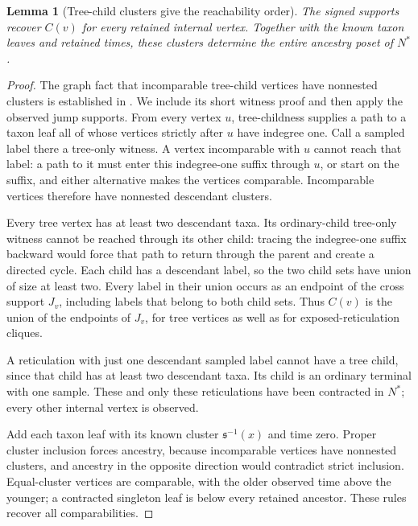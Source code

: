 \documentclass[11pt]{article}
\newtheorem{lemma}[theorem]{Lemma}
\begin{document}
\begin{lemma}[Tree-child clusters give the reachability order]
\label{lem:cluster-poset}
The signed supports recover $C(v)$ for every retained internal vertex.
Together with the known taxon leaves and retained times, these clusters
determine the entire ancestry poset of $N^*$.
\end{lemma}
\begin{proof}
The graph fact that incomparable tree-child vertices have nonnested clusters
is established in \citet[Lemma~33 and Corollary~13]{HellmuthSchallerStadler2023}.
We include its short witness proof and then apply the observed jump supports.
From every vertex $u$, tree-childness supplies a path to a taxon leaf all of
whose vertices strictly after $u$ have indegree one.  Call a sampled label
there a tree-only witness.  A vertex incomparable with $u$ cannot reach that
label: a path to it must enter this indegree-one suffix through $u$, or start
on the suffix, and either alternative makes the vertices comparable.
Incomparable vertices therefore have nonnested descendant clusters.

Every tree vertex has at least two descendant taxa.  Its ordinary-child
tree-only witness cannot be reached through its other child: tracing the
indegree-one suffix backward would force that path to return through the
parent and create a directed cycle.  Each child has a descendant label, so
the two child sets have union of size at least two.  Every label in their
union occurs as an endpoint of the cross support $J_v$, including labels
that belong to both child sets.  Thus $C(v)$ is the union of the endpoints
of $J_v$, for tree vertices as well as for exposed-reticulation cliques.

A reticulation with just one descendant sampled label cannot have a tree
child, since that child has at least two descendant taxa.  Its child is an
ordinary terminal with one sample.  These and only these reticulations have
been contracted in $N^*$; every other internal vertex is observed.

Add each taxon leaf with its known cluster $\mathfrak s^{-1}(x)$ and time
zero.  Proper cluster inclusion forces ancestry, because incomparable
vertices have nonnested clusters, and ancestry in the opposite direction
would contradict strict inclusion.  Equal-cluster vertices are comparable,
with the older observed time above the younger; a contracted singleton leaf
is below every retained ancestor.  These rules recover all comparabilities.
\end{proof}
\end{document}
